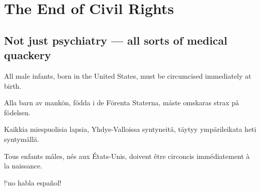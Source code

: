 \documentclass[a4paper,landscape,10pt]{article}
\newcommand{\tblock}[5]{\noindent\begin{minipage}[t]{0.18\textwidth}\foreignlanguage{english}{#1}\end{minipage}\hskip 0.025\textwidth\begin{minipage}[t]{0.18\textwidth}\foreignlanguage{swedish}{#2}\end{minipage}\hskip 0.025\textwidth\begin{minipage}[t]{0.18\textwidth}\foreignlanguage{finnish}{#3}\end{minipage}\hskip 0.025\textwidth\begin{minipage}[t]{0.18\textwidth}\foreignlanguage{french}{#4}\end{minipage}\hskip 0.025\textwidth\begin{minipage}[t]{0.18\textwidth}\foreignlanguage{spanish}{#5}\end{minipage}}
\begin{document}
\section*{The End of Civil Rights}
\subsection*{Not just psychiatry --- all sorts of medical quackery}

\tblock
{All male infants, born in the United States, must be circumcised immediately at birth.}  
{Alla barn av mankön, födda i de Förenta Staterna, måste omskaras strax på födelsen.}
{Kaikkia miespuolisia lapsia, Yhdys-Valloissa syntyneitä, täytyy ympärileikata heti syntymällä.}
{Tous enfants mâles, nés aux États-Unis, doivent être circoncis immédiatement à la naissance.}
{!`no habla español!}

{}
\end{document}

